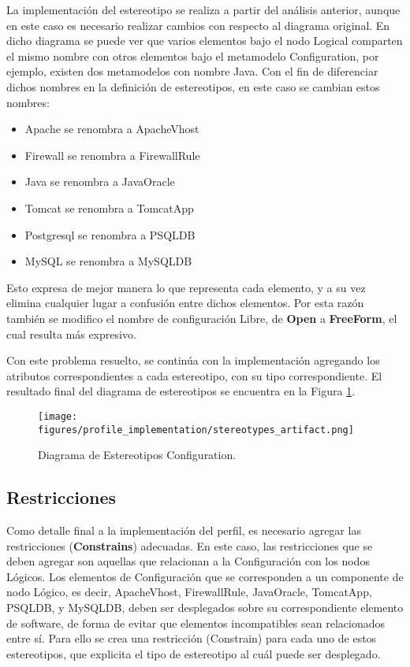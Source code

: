 La implementación del estereotipo se realiza a partir del análisis anterior, aunque en este caso es necesario realizar cambios con respecto al diagrama original. En dicho diagrama se puede ver que varios elementos bajo el nodo Logical comparten el mismo nombre con otros elementos bajo el metamodelo Configuration, por ejemplo, existen dos metamodelos con nombre Java.
Con el fin de diferenciar dichos nombres en la definición de estereotipos, en este caso se cambian estos nombres:
\begin{itemize}
    \item Apache se renombra a ApacheVhost
    \item Firewall se renombra a FirewallRule
    \item Java se renombra a JavaOracle
    \item Tomcat se renombra a TomcatApp
    \item Postgresql se renombra a PSQLDB
    \item MySQL se renombra a MySQLDB
\end{itemize}

Esto expresa de mejor manera lo que representa cada elemento, y a su vez elimina cualquier lugar a confusión entre dichos elementos. Por esta razón también se modifico el nombre de configuración Libre, de \textbf{Open} a \textbf{FreeForm}, el cual resulta más expresivo.

Con este problema resuelto, se continúa con la implementación agregando los atributos correspondientes a cada estereotipo, con su tipo correspondiente.
El resultado final del diagrama de estereotipos se encuentra en la Figura \ref{fig:profile:artifact}.

\begin{figure}[htbp]
    \centering
    \texttt{[image: figures/profile\_implementation/stereotypes\_artifact.png]}
    \caption{Diagrama de Estereotipos Configuration.}
    \label{fig:profile:artifact}
\end{figure}

\subsection{Restricciones}
Como detalle final a la implementación del perfil, es necesario agregar las restricciones (\textbf{Constrains}) adecuadas. En este caso, las restricciones que se deben agregar son aquellas que relacionan a la Configuración con los nodos Lógicos. Los elementos de Configuración que se corresponden a un componente de nodo Lógico, es decir, ApacheVhost, FirewallRule, JavaOracle, TomcatApp, PSQLDB, y MySQLDB, deben ser desplegados sobre su correspondiente elemento de software, de forma de evitar que elementos incompatibles sean relacionados entre sí.
Para ello se crea una restricción (Constrain) para cada uno de estos estereotipos, que explicita el tipo de estereotipo al cuál puede ser desplegado.

